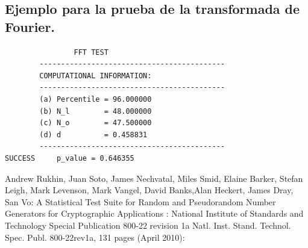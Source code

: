 \documentclass{llncs}
\theoremstyle{plane}
\begin{document}
\subsection{Ejemplo para la prueba de la transformada de Fourier.}


\begin{verbatim}
				FFT TEST
		-------------------------------------------
		COMPUTATIONAL INFORMATION:
		-------------------------------------------
		(a) Percentile = 96.000000
		(b) N_l        = 48.000000
		(c) N_o        = 47.500000
		(d) d          = 0.458831
		-------------------------------------------
SUCCESS		p_value = 0.646355
\end{verbatim}







%
%

\begin{thebibliography}{1}
Andrew Rukhin, Juan Soto, James Nechvatal, Miles
Smid, Elaine Barker, Stefan Leigh, Mark Levenson, Mark
Vangel, David Banks,Alan Heckert, James Dray, San Vo:  A Statistical Test Suite for
Random and Pseudorandom
Number Generators for
Cryptographic Applications :
National Institute of Standards and Technology Special Publication 800-22 revision 1a
Natl. Inst. Stand. Technol. Spec. Publ. 800-22rev1a, 131 pages (April 2010):
\end{thebibliography}
\end{document}
